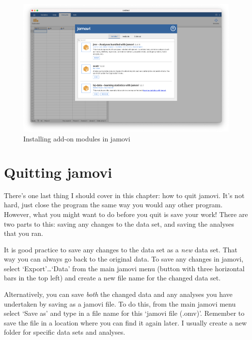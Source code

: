 \documentclass[
  a4paper,
]{book}
\begin{document}
\begin{figure}

\includegraphics[width=1\textwidth,height=\textheight]{images/fig3-6.png} \hfill{}

\caption{\label{fig-fig3-6}Installing add-on modules in jamovi}

\end{figure}

\hypertarget{quitting-jamovi}{%
\section{Quitting jamovi}\label{quitting-jamovi}}

There's one last thing I should cover in this chapter: how to quit
jamovi. It's not hard, just close the program the same way you would any
other program. However, what you might want to do before you quit is
save your work! There are two parts to this: saving any changes to the
data set, and saving the analyses that you ran.

It is good practice to save any changes to the data set as a \emph{new}
data set. That way you can always go back to the original data. To save
any changes in jamovi, select `Export'\ldots{}`Data' from the main
jamovi menu (button with three horizontal bars in the top left) and
create a new file name for the changed data set.

Alternatively, you can save \emph{both} the changed data and any
analyses you have undertaken by saving as a jamovi file. To do this,
from the main jamovi menu select `Save as' and type in a file name for
this `jamovi file (.omv)'. Remember to save the file in a location where
you can find it again later. I usually create a new folder for specific
data sets and analyses.
\end{document}
